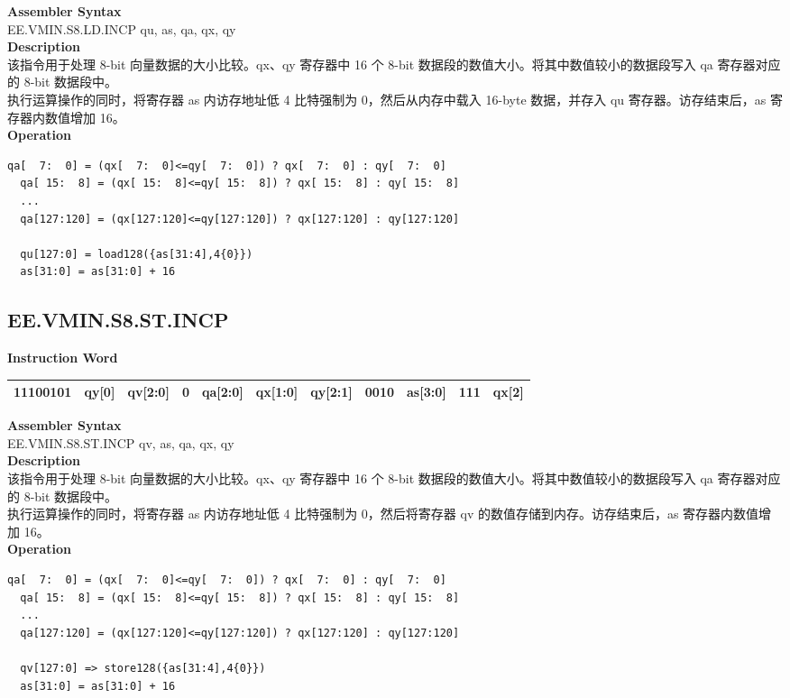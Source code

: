 \textbf{Assembler Syntax} \\
EE.VMIN.S8.LD.INCP qu, as, qa, qx, qy \\
\textbf{Description} \\
该指令用于处理 8-bit 向量数据的大小比较。qx、qy 寄存器中 16 个 8-bit 数据段的数值大小。将其中数值较小的数据段写入 qa 寄存器对应的 8-bit 数据段中。\\
执行运算操作的同时，将寄存器 as 内访存地址低 4 比特强制为 0，然后从内存中载入 16-byte 数据，并存入 qu 寄存器。访存结束后，as 寄存器内数值增加 16。\\
\textbf{Operation}
\begin{lstlisting}[escapeinside=`?]
  qa[  7:  0] = (qx[  7:  0]<=qy[  7:  0]) ? qx[  7:  0] : qy[  7:  0]
  qa[ 15:  8] = (qx[ 15:  8]<=qy[ 15:  8]) ? qx[ 15:  8] : qy[ 15:  8]
  ...
  qa[127:120] = (qx[127:120]<=qy[127:120]) ? qx[127:120] : qy[127:120]

  qu[127:0] = load128({as[31:4],4{0}})
  as[31:0] = as[31:0] + 16
\end{lstlisting}

\clearpage
\subsection{EE.VMIN.S8.ST.INCP}\label{instruction:EEVMINS8STINCP}
\setlength\tabcolsep{6pt}
\textbf{Instruction Word} \\
\begin{tabular}{|c|c|c|c|c|c|c|c|c|c|c|}
	\hline
	11100101 & qy[0] & qv[2:0] & 0 & qa[2:0] & qx[1:0] & qy[2:1] & 0010 & as[3:0] & 111 & qx[2] \\
	\hline
\end{tabular}

\textbf{Assembler Syntax} \\
EE.VMIN.S8.ST.INCP qv, as, qa, qx, qy \\
\textbf{Description} \\
该指令用于处理 8-bit 向量数据的大小比较。qx、qy 寄存器中 16 个 8-bit 数据段的数值大小。将其中数值较小的数据段写入 qa 寄存器对应的 8-bit 数据段中。\\
执行运算操作的同时，将寄存器 as 内访存地址低 4 比特强制为 0，然后将寄存器 qv 的数值存储到内存。访存结束后，as 寄存器内数值增加 16。\\
\textbf{Operation}
\begin{lstlisting}[escapeinside=`?]
  qa[  7:  0] = (qx[  7:  0]<=qy[  7:  0]) ? qx[  7:  0] : qy[  7:  0]
  qa[ 15:  8] = (qx[ 15:  8]<=qy[ 15:  8]) ? qx[ 15:  8] : qy[ 15:  8]
  ...
  qa[127:120] = (qx[127:120]<=qy[127:120]) ? qx[127:120] : qy[127:120]

  qv[127:0] => store128({as[31:4],4{0}})
  as[31:0] = as[31:0] + 16
\end{lstlisting}

